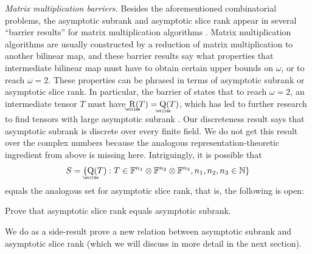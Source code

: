 \documentclass{daj}
\DeclareMathOperator{\asympsubrank}{\underaccent{\wtilde}{Q}}
\DeclareMathOperator{\asymprank}{\underaccent{\wtilde}{R}}
\newcommand{\FF}{\mathbb{F}}
\newcommand{\NN}{\mathbb{N}}
\begin{document}
\emph{Matrix multiplication barriers.} Besides the aforementioned combinatorial problems, the asymptotic subrank and asymptotic slice rank appear in several ``barrier results'' for matrix multiplication algorithms \cite{alman2018limits,v017a002,MR3631613}. Matrix multiplication algorithms are usually constructed by a reduction of matrix multiplication to another bilinear map, and these barrier results say what properties that intermediate bilinear map must have to obtain certain upper bounds on $\omega$, or to reach $\omega = 2$. These properties can be phrased in terms of asymptotic subrank or asymptotic slice rank. In particular, the barrier of \cite{v017a002} states that to reach $\omega = 2$, an intermediate tensor $T$ must have $\asymprank(T) = \asympsubrank(T)$, which has led to further research to find tensors with large asymptotic subrank \cite{DBLP:conf/mfcs/BlaserL20}. Our discreteness result says that asymptotic subrank is discrete over every finite field. We do not get this result over the complex numbers because the analogous representation-theoretic ingredient from above is missing here. Intriguingly, it is possible that 
\[
S = \{\asympsubrank(T) : T \in \FF^{n_1} \otimes \FF^{n_2} \otimes \FF^{n_3}, n_1, n_2, n_3 \in \NN\}
\]
equals the analogous set for asymptotic slice rank, that is, the following is open:
\begin{problem}
    Prove that asymptotic slice rank equals asymptotic subrank.
\end{problem}
We do as a side-result prove a new relation between asymptotic subrank and asymptotic slice rank (which we will discuss in more detail in the next section).
\end{document}
